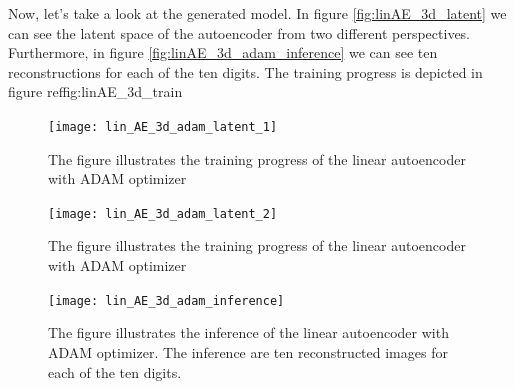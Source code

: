 Now, let's take a look at the generated model. In figure \ref{fig:linAE_3d_latent} we can see the latent space of the autoencoder from two different perspectives. Furthermore, in figure \ref{fig:linAE_3d_adam_inference} we can see ten reconstructions for each of the ten digits. The training progress is depicted in figure ref{fig:linAE_3d_train}

\begin{figure}
\begin{center}
   \begin{minipage}[b]{0.5\linewidth}
      \texttt{[image: lin\_AE\_3d\_adam\_latent\_1]}
      \caption{The figure illustrates the training progress of the linear autoencoder with ADAM optimizer }\label{fig:lin_AE_3d_adam_train}
	\end{minipage}
	\begin{minipage}[b]{0.5\linewidth}
      \texttt{[image: lin\_AE\_3d\_adam\_latent\_2]}
      \caption{The figure illustrates the training progress of the linear autoencoder with ADAM optimizer }\label{fig:lin_AE_3d_adam_train}
	\end{minipage}
\end{center}
\end{figure}


\begin{figure}
\begin{center}
   \begin{minipage}[b]{0.9\linewidth}
      \texttt{[image: lin\_AE\_3d\_adam\_inference]}
      \caption{The figure illustrates the inference of the linear autoencoder with ADAM optimizer. The inference are ten reconstructed images for each of the ten digits.}\label{fig:lin_AE_3d_adam_inference}
	\end{minipage}
\end{center}
\end{figure}


